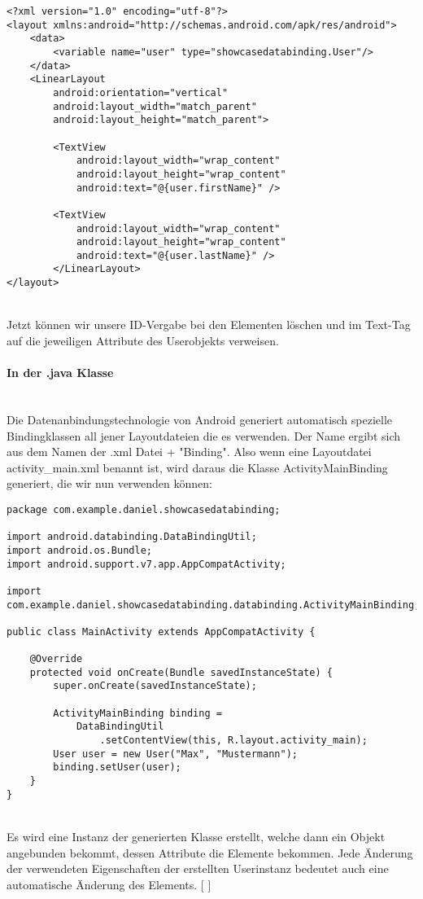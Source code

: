 \documentclass[FIPLY_base.tex]{subfiles}
\begin{document}
\begin{lstlisting}[caption={Die XML Datei nach der Integration einer Datenanbindung.},label=DescriptiveLabel]
<?xml version="1.0" encoding="utf-8"?>
<layout xmlns:android="http://schemas.android.com/apk/res/android">
    <data>
	    <variable name="user" type="showcasedatabinding.User"/>
    </data>
    <LinearLayout
	    android:orientation="vertical"
	    android:layout_width="match_parent"
	    android:layout_height="match_parent">
    
	    <TextView
	        android:layout_width="wrap_content"
	        android:layout_height="wrap_content"
	        android:text="@{user.firstName}" />
		    
	    <TextView
	        android:layout_width="wrap_content"
	        android:layout_height="wrap_content"
	        android:text="@{user.lastName}" />
	    </LinearLayout>
</layout>
\end{lstlisting}
\ \\
Jetzt können wir unsere ID-Vergabe bei den Elementen löschen und im Text-Tag auf die jeweiligen Attribute des Userobjekts verweisen.

\paragraph{In der .java Klasse}
\ \\
Die Datenanbindungstechnologie von Android generiert automatisch spezielle Bindingklassen all jener Layoutdateien die es verwenden. Der Name ergibt sich aus dem Namen der .xml Datei + "Binding". Also wenn eine Layoutdatei activity\_main.xml benannt ist, wird daraus die Klasse ActivityMainBinding generiert, die wir nun verwenden können:

\begin{lstlisting}[caption={Die Aktivitätenklasse nach der Integration einer Datenanbindung.},label=DescriptiveLabel]
package com.example.daniel.showcasedatabinding;

import android.databinding.DataBindingUtil;
import android.os.Bundle;
import android.support.v7.app.AppCompatActivity;

import com.example.daniel.showcasedatabinding.databinding.ActivityMainBinding;

public class MainActivity extends AppCompatActivity {

	@Override
	protected void onCreate(Bundle savedInstanceState) {
		super.onCreate(savedInstanceState);

		ActivityMainBinding binding =
			DataBindingUtil
				.setContentView(this, R.layout.activity_main);
		User user = new User("Max", "Mustermann");
		binding.setUser(user);
	}
}
\end{lstlisting}
\ \\
Es wird eine Instanz der generierten Klasse erstellt, welche dann ein Objekt angebunden bekommt, dessen Attribute die Elemente bekommen. Jede Änderung der verwendeten Eigenschaften der erstellten Userinstanz bedeutet auch eine automatische Änderung des Elements. 
[ \cite{datbshowcase}]
\end{document}
